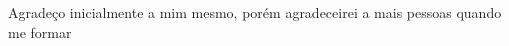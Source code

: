 \begin{agradecimentos}

Agradeço inicialmente a mim mesmo, porém agradeceirei a mais pessoas quando me formar

\end{agradecimentos}
